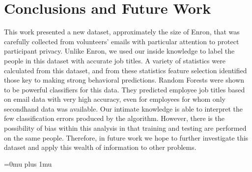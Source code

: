 \documentclass{article}
\begin{document}
\section{Conclusions and Future Work} \label{Conclusions}
This work presented a new dataset, approximately the size of Enron, that was carefully collected from volunteers' emails with particular attention to protect participant privacy.  Unlike Enron, we used our inside knowledge to label the people in this dataset with accurate job titles.  A variety of statistics were calculated from this dataset, and from these statistics feature selection identified those key to making strong behavioral predictions.  Random Forests were shown to be powerful classifiers for this data.  They predicted employee job titles based on email data with very high accuracy, even for employees for whom only secondhand data was available.  Our intimate knowledge is able to interpret the few classification errors produced by the algorithm.  However, there is the possibility of bias within this analysis in that training and testing are performed on the same people.  Therefore, in future work we hope to further investigate this dataset and apply this wealth of information to other problems.


\clearpage
\Urlmuskip=0mu plus 1mu\relax


\end{document}

